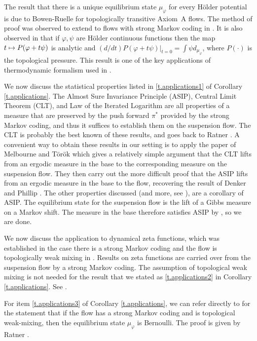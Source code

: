 \documentclass[11pt]{article}
\def\mto{\mathchoice{\longmapsto}{\mapsto}{\mapsto}{\mapsto}}
\theoremstyle{definition}
\numberwithin{equation}{section}
\begin{document}
The result that there is a unique equilibrium state $\mu_\varphi$ for every Hölder potential is due to Bowen-Ruelle \cite{bowen-ruelle} for topologically transitive Axiom~A flows. The method of proof was observed to extend to flows with strong Markov coding in \cite{pollicott}. It is also observed in \cite{pollicott} that if $\varphi, \psi$ are Hölder continuous functions then the map $t \mto P(\varphi + t \psi)$ is analytic and $(d/dt)P(\varphi+ t \psi)|_{t=0} = \int \psi d_{\mu_\varphi}$, where $P(\cdot)$ is the topological pressure. This result is one of the key applications of thermodynamic formalism used in \cite{bcls, aS16}.

We now discuss the statistical properties listed in \eqref{t.applications1} of Corollary \ref{t.applications}. The Almost Sure Invariance Principle (ASIP), Central Limit Theorem (CLT), and Law of the Iterated Logarithm are all properties of a measure that are preserved by the push forward $\pi^\ast$ provided by the strong Markov coding, and thus it suffices to establish them on the suspension flow. The CLT is probably the best known of these results, and goes back to Ratner \cite{ratner}.
A convenient way to obtain these results in our setting is to apply the paper of Melbourne and Török \cite{MT04} which gives a relatively simple argument that the CLT lifts from an ergodic measure in the base to the corresponding measure on the suspension flow. They then carry out the more difficult proof that the ASIP lifts from an ergodic measure in the base to the flow, recovering the result of Denker and Phillip \cite{DP84}. The other properties discussed (and more, see \cite{MT04}), are a corollary of ASIP. The equilibrium state for the suspension flow is the lift of a Gibbs measure on a Markov shift. The measure in the base therefore satisfies ASIP by \cite{DP84}, so we are done.

We now discuss the application to dynamical zeta functions, which was established in the case there is a strong Markov coding and the flow is topologically weak mixing in \cite{pollicott}. Results on zeta functions are carried over from the suspension flow by a strong Markov coding. The assumption of topological weak mixing is not needed for the result that we stated as \eqref{t.applications2} in Corollary \ref{t.applications}. See \cite[Chap.\,6]{PP}.

For item \eqref{t.applications3} of Corollary \ref{t.applications}, we can refer directly to \cite{pollicott} for the statement that if the flow has a strong Markov coding and is topological weak-mixing, then the equilibrium state $\mu_\varphi$ is Bernoulli. The proof is given by Ratner \cite{ratner2}.
\end{document}
